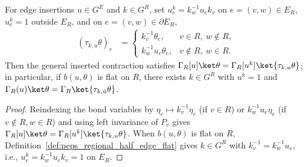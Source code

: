 \begin{lemma}%
    \label{thm:peps_regional_flat_column_transport}
    \leanok
    For edge insertions $u\in G^E$ and $k\in G^R$, set $u^k_e=k_w^{-1}u_ek_v$ on $e=(v,w)\in E_R$, $u^k_e=1$ outside $E_R$, and on $e=(v,w)\in\partial E_R$,
    \begin{align}
        (\tau_{k,u}\theta)_e & =
        \begin{cases}
            k_v^{-1}\theta_e,    & v\in R,\ w\notin R, \\
            k_w^{-1}u_e\theta_e, & v\notin R,\ w\in R.
        \end{cases}
        \label{eq:peps_regional_column_boundary_transport}
    \end{align}
    Then the general inserted contraction satisfies $\Gamma_R[u]\ket\theta=\Gamma_R[u^k]\ket{\tau_{k,u}\theta}$; in particular, if $b(u,\theta)$ is flat on $R$, there exists $k\in G^R$ with $u^k=1$ and $\Gamma_R(u)\ket\theta=\Gamma_R\ket{\tau_{k,\bar u}\theta}$.
\end{lemma}
\begin{proof}\leanok
    Reindexing the bond variables by $\eta_e\mapsto k_v^{-1}\eta_e$ (if $v\in R$) or $k_w^{-1}u_e\eta_e$ (if $v\notin R,w\in R$) and using left invariance of $P_v$ gives $\Gamma_R[u]\ket\theta=\Gamma_R[u^k]\ket{\tau_{k,u}\theta}$. When $b(u,\theta)$ is flat on $R$, Definition~\ref{def:peps_regional_half_edge_flat} gives $k\in G^R$ with $k_v^{-1}=k_w^{-1}u_e$, i.e., $u^k_e=k_w^{-1}u_ek_v=1$ on $E_R$.
\end{proof}

